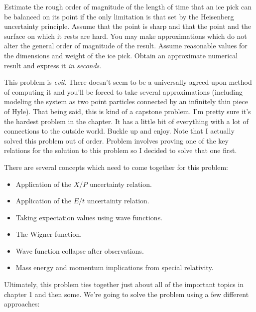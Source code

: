 \newcommand{\icepick}{Heisenberg's ice-pick}

\begin{question}
  Estimate the rough order of magnitude of the length of time that an
  ice pick can be balanced on its point if the only limitation is that
  set by the Heisenberg uncertainty principle. Assume that the point
  is sharp and that the point and the surface on which it rests are
  hard. You may make approximations which do not alter the general
  order of magnitude of the result. Assume reasonable values for the
  dimensions and weight of the ice pick. Obtain an approximate
  numerical result and express it \emph{in seconds}.
\end{question}

\begin{purpose}
  This problem is \emph{evil}.  There doesn't seem to be a universally
  agreed-upon method of computing it and you'll be forced to take
  several approximations (including modeling the system as two point
  particles connected by an infinitely thin piece of Hyle).  That
  being said, this is kind of a capstone problem.  I'm pretty sure it's
  the hardest problem in the chapter.  It has a little bit of
  everything with a lot of connections to the outside world.  Buckle
  up and enjoy.  Note that I actually solved this problem out of
  order.  Problem  involves proving one of the
  key relations for the solution to this problem so I decided to solve
  that one first.

  There are several concepts which need to come together for this
  problem:

  \begin{itemize}
  \item Application of the $X/P$ uncertainty relation.
  \item Application of the $E/t$ uncertainty relation.
  \item Taking expectation values using wave functions.
  \item The Wigner function.
  \item Wave function collapse after observations.
  \item Mass energy and momentum implications from special relativity.
  \end{itemize}

  Ultimately, this problem ties together just about all of the
  important topics in chapter 1 and then some.  We're going to solve
  the problem using a few different approaches:
  

\end{purpose}
